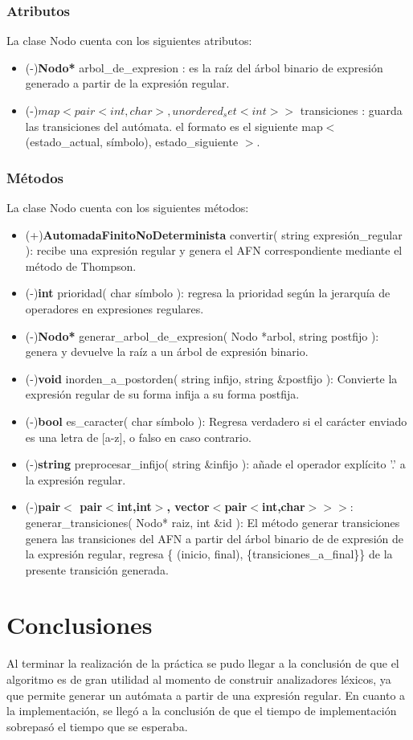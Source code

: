\documentclass[12pt,letterpaper]{article}
\begin{document}
\subsubsection{Atributos}
La clase Nodo cuenta con los siguientes atributos:
\begin{itemize}
    \item (-)\textbf{Nodo*} arbol\_de\_expresion : es la raíz del árbol binario de expresión generado a partir de la expresión regular.
    \item (-)\textbf{$map<pair<int, char>,unordered_set<int>>$} transiciones : guarda las transiciones del autómata. el formato es el siguiente map$<$ {(estado\_actual, símbolo)}, estado\_siguiente $>$.
    
\end{itemize}

\subsubsection{Métodos}
La clase Nodo cuenta con los siguientes métodos:
\begin{itemize}
    \item (+)\textbf{AutomadaFinitoNoDeterminista} convertir( string expresión\_regular ): recibe una expresión regular y genera el AFN correspondiente mediante el método de Thompson.
    \item (-)\textbf{int} prioridad( char símbolo ): regresa la prioridad según la jerarquía de operadores en expresiones regulares.
    \item (-)\textbf{Nodo*} generar\_arbol\_de\_expresion( Nodo *arbol, string postfijo ): genera y devuelve la raíz a un árbol de expresión binario.
    \item (-)\textbf{void} inorden\_a\_postorden( string infijo, string \&postfijo ): Convierte la expresión regular de su forma infija a su forma postfija.
    \item (-)\textbf{bool} es\_caracter( char símbolo ): Regresa verdadero si el carácter enviado es una letra de [a-z], o falso en caso contrario.
    \item (-)\textbf{string} preprocesar\_infijo( string \&infijo ): añade el operador explícito '.' a la expresión regular.
    \item (-)\textbf{pair$<$ pair$<$int,int$>$, vector$<$pair$<$int,char$>> >$}: generar\_transiciones( Nodo* raiz, int \&id ): El método generar transiciones genera las transiciones del AFN a partir del árbol binario de de expresión de la expresión regular, regresa \{ (inicio, final), \{transiciones\_a\_final\}\} de la presente transición generada.
\end{itemize}


\newpage
\section{Conclusiones}
Al terminar la realización de la práctica se pudo llegar a la conclusión de que el algoritmo es de gran utilidad al momento de construir analizadores léxicos, ya que permite generar un autómata a partir de una expresión regular. En cuanto a la implementación, se llegó a la conclusión de que el tiempo de implementación sobrepasó el tiempo que se esperaba.
\end{document}
